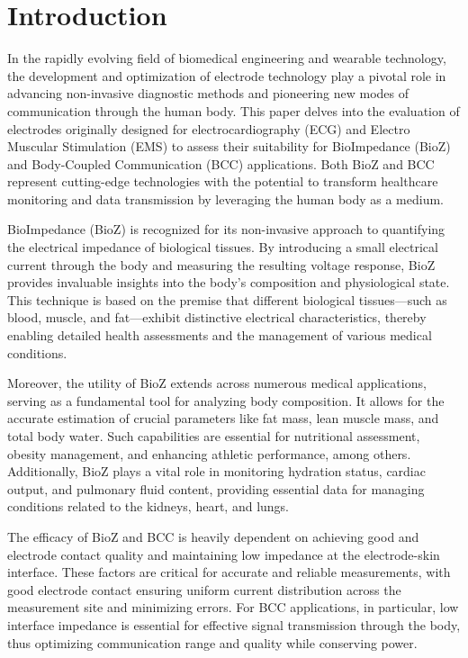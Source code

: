 \section{Introduction}
{
In the rapidly evolving field of biomedical engineering and wearable technology, the development and optimization of electrode technology play a pivotal role in advancing non-invasive diagnostic methods and pioneering new modes of communication through the human body. This paper delves into the evaluation of electrodes originally designed for electrocardiography (ECG)  and Electro Muscular Stimulation (EMS) to assess their suitability for BioImpedance (BioZ) and Body-Coupled Communication (BCC) applications. Both BioZ and BCC represent cutting-edge technologies with the potential to transform healthcare monitoring and data transmission by leveraging the human body as a medium.

BioImpedance (BioZ) is recognized for its non-invasive approach to quantifying the electrical impedance of biological tissues. By introducing a small electrical current through the body and measuring the resulting voltage response, BioZ provides invaluable insights into the body's composition and physiological state. This technique is based on the premise that different biological tissues—such as blood, muscle, and fat—exhibit distinctive electrical characteristics, thereby enabling detailed health assessments and the management of various medical conditions.

Moreover, the utility of BioZ extends across numerous medical applications, serving as a fundamental tool for analyzing body composition. It allows for the accurate estimation of crucial parameters like fat mass, lean muscle mass, and total body water. Such capabilities are essential for nutritional assessment, obesity management, and enhancing athletic performance, among others. Additionally, BioZ plays a vital role in monitoring hydration status, cardiac output, and pulmonary fluid content, providing essential data for managing conditions related to the kidneys, heart, and lungs.

The efficacy of BioZ and BCC is heavily dependent on achieving good and electrode contact quality and maintaining low impedance at the electrode-skin interface. These factors are critical for accurate and reliable measurements, with good electrode contact ensuring uniform current distribution across the measurement site and minimizing errors. For BCC applications, in particular, low interface impedance is essential for effective signal transmission through the body, thus optimizing communication range and quality while conserving power.



}
